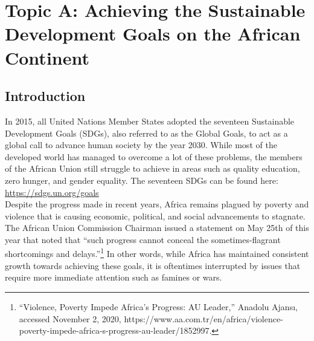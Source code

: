 \documentclass[10pt, letterpaper]{article}
\begin{document}
\newpage
\section{Topic A: Achieving the Sustainable Development Goals on the African Continent}

\subsection{Introduction}

In 2015, all United Nations Member States adopted the seventeen
Sustainable Development Goals (SDGs), also referred to as the Global
Goals, to act as a global call to advance human society by the year
2030. While most of the developed world has managed to overcome a lot of
these problems, the members of the African Union still struggle to
achieve in areas such as quality education, zero hunger, and gender
equality. The seventeen SDGs can be found here:
\href{https://sdgs.un.org/goals}{\underline{https://sdgs.un.org/goals}} \\

Despite the progress made in recent years, Africa remains plagued by
poverty and violence that is causing economic, political, and social
advancements to stagnate. The African Union Commission Chairman issued a
statement on May 25th of this year that noted that ``such progress
cannot conceal the sometimes-flagrant shortcomings and
delays.''\footnote{``Violence, Poverty Impede Africa's Progress: AU
  Leader,'' Anadolu Ajansı, accessed November 2, 2020,
  https://www.aa.com.tr/en/africa/violence-poverty-impede-africa-s-progress-au-leader/1852997.}
In other words, while Africa has maintained consistent growth towards
achieving these goals, it is oftentimes interrupted by issues that
require more immediate attention such as famines or wars. \\
\end{document}

